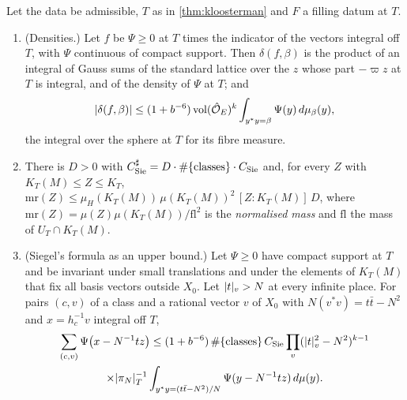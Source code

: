 \begin{theorem}\label{thm:siegel-top}
Let the data be admissible, $T$ as in \cref{thm:kloosterman} and $F$ a filling datum at $T$.
\begin{enumerate}[label=\textup{(\alph*)}]
\item (Densities.) Let $f$ be $\Psi\ge0$ at $T$ times the indicator of the vectors integral off $T$, with $\Psi$ continuous of compact support. Then $\delta(f,\beta)$ is the product of an integral
of Gauss sums of the standard lattice over the $z$ whose part $-\varpi z$ at $T$ is integral, and of the density of $\Psi$ at $T$; and
\[
  \lvert \delta(f,\beta)\rvert\le(1+b^{-6})\operatorname{vol}(\hat{\mathcal{O}}_E)^k\int_{y^*y=\beta}\Psi(y)\,d\mu_\beta(y),
\]
the integral over the sphere at $T$ for its fibre measure.
\item There is $D>0$ with $C^\sharp_{\rm Sie}=D\cdot\#\{\text{classes}\}\cdot C_{\rm Sie}$ and, for every $Z$ with $K_T(M)\le Z\le K_T$, $\mathrm{mr}(Z)\le\mu_H(K_T(M))\,\mu(K_T(M))^2\,[Z:K_T(M)]\,D$, where
$\mathrm{mr}(Z)=\mu(Z)\mu(K_T(M))/\mathrm{fl}^2$ is the \emph{normalised mass} and $\mathrm{fl}$ the mass of $U_T\cap K_T(M)$.
\item (Siegel's formula as an upper bound.) Let $\Psi\ge0$ have compact support at $T$ and be invariant under small translations and under the elements of $K_T(M)$ that fix all basis vectors
outside $X_0$. Let $\lvert t\rvert_v>N$ at every infinite place. For pairs $(c,v)$ of a class and a rational vector $v$ of $X_0$ with $N(v^*v)=t\bar t-N^2$ and $x=h_c^{-1}v$ integral off $T$,
\begin{multline*}
  \sum_{(c,v)}\Psi\bigl(x-N^{-1}tz\bigr)\le(1+b^{-6})\,\#\{\text{classes}\}\,C_{\rm Sie}\prod_v(\lvert t\rvert_v^2-N^2)^{k-1}\\
  \times\lvert \pi_N\rvert_T^{-1}\int_{y^*y=(t\bar t-N^2)/N}\Psi(y-N^{-1}tz)\,d\mu(y).
\end{multline*}
\end{enumerate}
\end{theorem}

